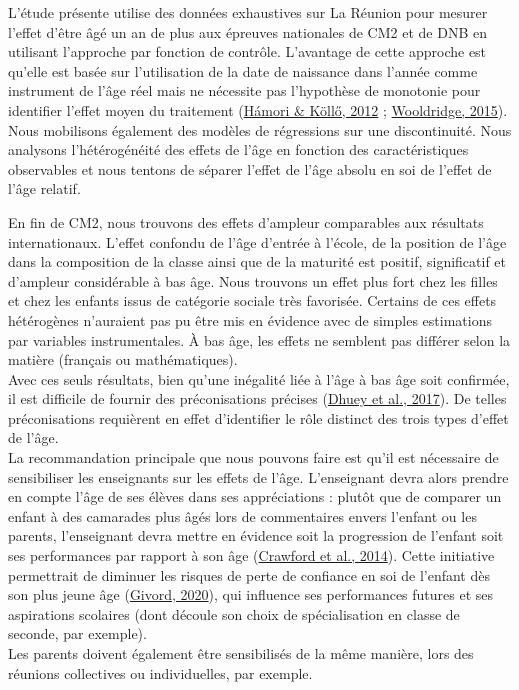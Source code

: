 \documentclass[
]{book}
\begin{document}
L'étude présente utilise des données exhaustives sur La Réunion pour mesurer l'effet d'être âgé un an de plus aux épreuves nationales de CM2 et de DNB en utilisant l'approche par fonction de contrôle. L'avantage de cette approche est qu'elle est basée sur l'utilisation de la date de naissance dans l'année comme instrument de l'âge réel mais ne nécessite pas l'hypothèse de monotonie pour identifier l'effet moyen du traitement (\protect\hyperlink{ref-HAM:KOL:12}{Hámori \& Köllő, 2012} ; \protect\hyperlink{ref-WOO:15}{Wooldridge, 2015}). Nous mobilisons également des modèles de régressions sur une discontinuité. Nous analysons l'hétérogénéité des effets de l'âge en fonction des caractéristiques observables et nous tentons de séparer l'effet de l'âge absolu en soi de l'effet de l'âge relatif.

\quad En fin de CM2, nous trouvons des effets d'ampleur comparables aux résultats internationaux. L'effet confondu de l'âge d'entrée à l'école, de la position de l'âge dans la composition de la classe ainsi que de la maturité est positif, significatif et d'ampleur considérable à bas âge. Nous trouvons un effet plus fort chez les filles et chez les enfants issus de catégorie sociale très favorisée. Certains de ces effets hétérogènes n'auraient pas pu être mis en évidence avec de simples estimations par variables instrumentales. À bas âge, les effets ne semblent pas différer selon la matière (français ou mathématiques).\\
Avec ces seuls résultats, bien qu'une inégalité liée à l'âge à bas âge soit confirmée, il est difficile de fournir des préconisations précises (\protect\hyperlink{ref-DHU:eal:17}{Dhuey et al., 2017}). De telles préconisations requièrent en effet d'identifier le rôle distinct des trois types d'effet de l'âge.\\
La recommandation principale que nous pouvons faire est qu'il est nécessaire de sensibiliser les enseignants sur les effets de l'âge. L'enseignant devra alors prendre en compte l'âge de ses élèves dans ses appréciations : plutôt que de comparer un enfant à des camarades plus âgés lors de commentaires envers l'enfant ou les parents, l'enseignant devra mettre en évidence soit la progression de l'enfant soit ses performances par rapport à son âge (\protect\hyperlink{ref-CRA:eal:14}{Crawford et al., 2014}). Cette initiative permettrait de diminuer les risques de perte de confiance en soi de l'enfant dès son plus jeune âge (\protect\hyperlink{ref-GIV:20}{Givord, 2020}), qui influence ses performances futures et ses aspirations scolaires (dont découle son choix de spécialisation en classe de seconde, par exemple).\\
Les parents doivent également être sensibilisés de la même manière, lors des réunions collectives ou individuelles, par exemple.
\end{document}
